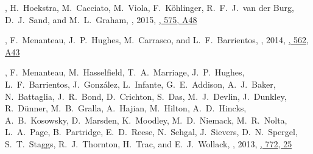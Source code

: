 \item
\myself, H.~Hoekstra, M.~Cacciato, M.~Viola, F.~Köhlinger, R.~F.~J.~van der Burg, D.~J.~Sand, and M.~L.~Graham,
,
2015, \href{https://ui.adsabs.harvard.edu/abs/2015A&A...575A..48S}{\aap, 575, A48}

\item
\myself, F.~Menanteau, J.~P.~Hughes, M.~Carrasco, and L.~F.~Barrientos,
,
2014, \href{https://ui.adsabs.harvard.edu/abs/2014A&A...562A..43S}{\aap, 562, A43}

\item
\myself, F.~Menanteau, M.~Hasselfield, T.~A.~Marriage, J.~P.~Hughes, L.~F.~Barrientos, J.~González, L.~Infante, G.~E.~Addison, A.~J.~Baker, N.~Battaglia, J.~R.~Bond, D.~Crichton, S.~Das, M.~J.~Devlin, J.~Dunkley, R.~Dünner, M.~B.~Gralla, A.~Hajian, M.~Hilton, A.~D.~Hincks, A.~B.~Kosowsky, D.~Marsden, K.~Moodley, M.~D.~Niemack, M.~R.~Nolta, L.~A.~Page, B.~Partridge, E.~D.~Reese, N.~Sehgal, J.~Sievers, D.~N.~Spergel, S.~T.~Staggs, R.~J.~Thornton, H.~Trac, and E.~J.~Wollack,
,
2013, \href{https://ui.adsabs.harvard.edu/abs/2013ApJ...772...25S}{\apj, 772, 25}

